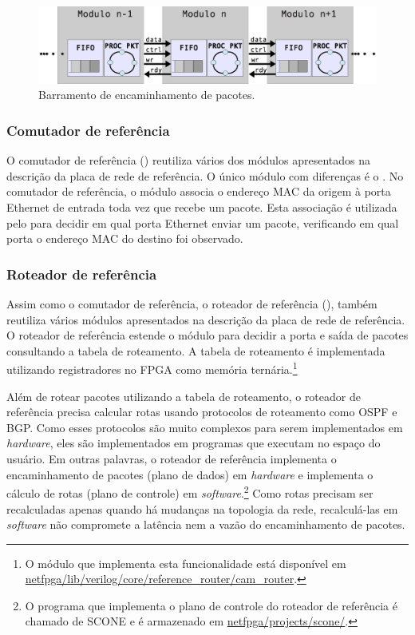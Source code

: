 \begin{figure}
\centering
\includegraphics[scale=0.6,angle=0]{figures/modulos/fifo.eps}
\caption{Barramento de encaminhamento de pacotes.}
\label{fig:arch.pipe.sinais}
\end{figure}


\subsubsection*{Comutador de referência}

O comutador de referência () reutiliza vários
dos módulos apresentados na descrição da placa de rede de
referência.  O único módulo com diferenças é o
.  No comutador de referência, o módulo
 associa o endereço MAC da origem à porta
Ethernet de entrada toda vez que recebe um pacote.  Esta associação
é utilizada pelo  para decidir em qual
porta Ethernet enviar um pacote, verificando em qual porta o
endereço MAC do destino foi observado.

\subsubsection*{Roteador de referência}

Assim como o comutador de referência, o roteador de referência
(), também reutiliza vários módulos
apresentados na descrição da placa de rede de referência.  O
roteador de referência estende o módulo 
para decidir a porta e saída de pacotes consultando a tabela de
roteamento.  A tabela de roteamento é implementada utilizando
registradores no FPGA como memória ternária.\footnote{O módulo que
implementa esta funcionalidade está disponível em
\url{netfpga/lib/verilog/core/reference_router/cam_router}.}

Além de rotear pacotes utilizando a tabela de roteamento, o roteador
de referência precisa calcular rotas usando protocolos de roteamento
como OSPF e BGP.  Como esses protocolos são muito complexos para
serem implementados em \emph{hardware}, eles são implementados em
programas que executam no espaço do usuário.  Em outras palavras, o
roteador de referência implementa o encaminhamento de pacotes (plano
de dados) em \emph{hardware} e implementa o cálculo de rotas (plano
de controle) em \emph{software}.\footnote{O programa que implementa
o plano de controle do roteador de referência é chamado de SCONE e é
armazenado em \url{netfpga/projects/scone/}.} Como rotas precisam
ser recalculadas apenas quando há mudanças na topologia da rede,
recalculá-las em \emph{software} não compromete a latência nem a
vazão do encaminhamento de pacotes.

